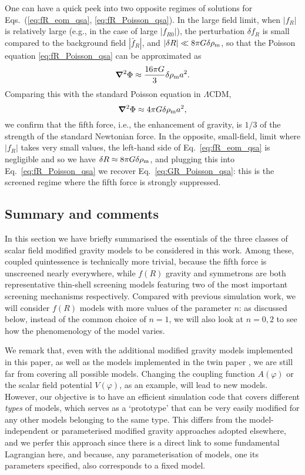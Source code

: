 One can have a quick peek into two opposite regimes of solutions for Eqs.~(\ref{eq:fR_eom_qsa}, \ref{eq:fR_Poisson_qsa}). In the large field limit, when $|f_R|$ is relatively large (e.g., in the case of large $|f_{R0}|$), the perturbation $\delta f_R$ is small compared to the background field $|\bar{f}_R|$, and $|\delta R|\ll8\pi{G}\delta\rho_{\rm m}$, so that the Poisson equation \eqref{eq:fR_Poisson_qsa} can be approximated as 
\begin{equation}
    \boldsymbol{\nabla}^2\Phi \approx \frac{16\pi{G}}{3}\delta\rho_{\rm m}a^2.
\end{equation}
Comparing this with the standard Poisson equation in $\Lambda$CDM,
\begin{equation}\label{eq:GR_Poisson_qsa}
    \boldsymbol{\nabla}^2\Phi \approx {4\pi{G}}\delta\rho_{\rm m}a^2,
\end{equation}
we confirm that the fifth force, i.e., the enhancement of gravity, is $1/3$ of the strength of the standard Newtonian force. In the opposite, small-field, limit where $|f_R|$ takes very small values, the left-hand side of Eq.~\eqref{eq:fR_eom_qsa} is negligible and so we have $\delta{R}\approx8\pi{G}\delta\rho_{\rm m}$, and plugging this into Eq.~\eqref{eq:fR_Poisson_qsa} we recover Eq.~\eqref{eq:GR_Poisson_qsa}: this is the screened regime where the fifth force is strongly suppressed.

\subsection{Summary and comments}
\label{subsect:model_summary}

In this section we have briefly summarised the essentials of the three classes of scalar field modified gravity models to be considered in this work. Among these, coupled quintessence is technically more trivial, because the fifth force is unscreened nearly everywhere, while $f(R)$ gravity and symmetrons are both representative thin-shell screening models \cite{Brax:2012gr} featuring two of the most important screening mechanisms respectively. Compared with previous simulation work, we will consider $f(R)$ models with more values of the parameter $n$: as discussed below, instead of the common choice of $n=1$, we will also look at $n=0,2$ to see how the phenomenology of the model varies.  

We remark that, even with the additional modified gravity models implemented in this paper, as well as the models implemented in the twin paper \cite{Hernandez-Aguayo:2021_twin_paper}, we are still far from covering all possible models. Changing the coupling function $A(\varphi)$ or the scalar field potential $V(\varphi)$, as an example, will lead to new models. However, our objective is to have an efficient simulation code that covers different \textit{types} of models, which serves as a `prototype' that can be very easily modified for any other models belonging to the same type. This differs from the model-independent \cite{Srinivasan:2021gib} or parameterised modified gravity \cite{Hassani:2020rxd} approaches adopted elsewhere, and we perfer this approach since there is a direct link to some fundamental Lagrangian here, and because, any parameterisation of models, one its parameters specified, also corresponds to a fixed model.